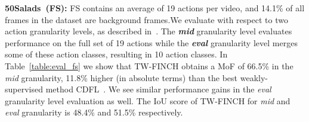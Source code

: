 \documentclass[10pt,twocolumn,letterpaper]{article}
\begin{document}
\noindent\textbf{50Salads~(FS):} FS contains an average of 19 actions per video, and 14.1\% of all frames in the dataset are background frames.We evaluate with respect to two action granularity levels, as described in~\cite{fs_paper}. The \textbf{\textit{mid}} granularity level evaluates performance on the full set of 19 actions while the \textbf{\textit{eval}} granularity level merges some of these action classes, resulting in 10 action classes. In Table~\ref{table:eval_fs} we show that TW-FINCH obtains a MoF of 66.5\% in the \textit{mid} granularity, 11.8\% higher (in absolute terms) than the best weakly-supervised method CDFL~\cite{cdfl}. 
We see similar performance gains in the \textit{eval} granularity level evaluation as well. The IoU score of TW-FINCH for \textit{mid} and \textit{eval} granularity is 48.4\% and 51.5\% respectively.




\begin{table}[t]
\centering
{}
\caption{Comparison on the MPII Cooking 2 dataset~\cite{mpii_paper}.
\label{table:eval_mpii}}
\end{table}
\end{document}
